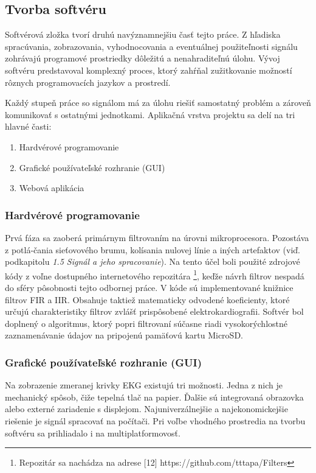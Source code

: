 \documentclass[titlepage,12pt]{article}
\begin{document}
\newpage
\subsection{Tvorba softvéru}
Softvérová zložka tvorí druhú navýznamnejšiu časť tejto práce. Z hľadiska spracúvania, \linebreak zobrazovania, vyhodnocovania a eventuálnej použiteľnosti signálu zohrávajú programové \linebreak prostriedky dôležitú a nenahraditeľnú úlohu. Vývoj softvéru predstavoval komplexný proces, ktorý zahŕňal zužitkovanie možností rôznych programovacích jazykov a prostredí.

Každý stupeň práce so signálom má za úlohu riešiť samostatný problém a zároveň komunikovať s ostatnými jednotkami. Aplikačná vrstva projektu sa delí na tri hlavné časti:
\begin{enumerate}
	\item Hardvérové programovanie
	\item Grafické používateľské rozhranie (GUI)
	\item Webová aplikácia
\end{enumerate}

\subsubsection{Hardvérové programovanie}
Prvá fáza sa zaoberá primárnym filtrovaním na úrovni mikroprocesora. Pozostáva z potlá-čania sieťovového brumu, kolísania nulovej línie a iných artefaktov (viď. podkapitolu \textit{1.5 Signál \linebreak a jeho spracovanie}). Na tento účel boli použité zdrojové kódy z voľne dostupného internetového repozitára \footnote{Repozitár sa nachádza na adrese [12] https://github.com/tttapa/Filters}, keďže návrh filtrov nespadá do sféry pôsobnosti tejto odbornej práce. V kóde sú implementované knižnice filtrov FIR a IIR. Obsahuje taktiež matematicky odvodené koeficienty, ktoré určujú charakteristiky filtrov zvlášť prispôsobené elektrokardiografii. Softvér bol doplnený o algoritmus, ktorý popri filtrovaní súčasne riadi vysokorýchlostné zaznamenávanie údajov na pripojenú pamäťovú kartu MicroSD.

\subsubsection{Grafické používateľské rozhranie (GUI)}
Na zobrazenie zmeranej krivky EKG existujú tri možnosti. Jedna z nich je mechanický spôsob, čiže tepelná tlač na papier. Ďalšie sú integrovaná obrazovka alebo externé zariadenie \linebreak s displejom. Najuniverzálnejšie a najekonomickejšie riešenie je signál spracovať na počítači. Pri voľbe vhodného prostredia na tvorbu softvéru sa prihliadalo i na multiplatformovosť.
\end{document}

